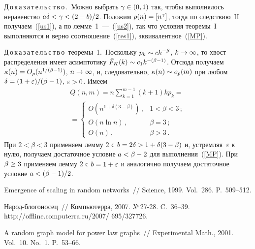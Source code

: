 \begin{multicols}{2}
    
    \medskip
    
    \noindent
    Д\,о\,к\,а\,з\,а\,т\,е\,л\,ь\,с\,т\,в\,о\,.\
    Можно выбрать $\gamma\hm\in (0,1)$
    так, чтобы выполнялось неравенство $a\delta\hm<\gamma\hm<(2-b)/2$.
    Положим $\rho(n)\hm=[n^\gamma]$, тогда
    по следствию~II получаем~(\ref{us1}), а по лемме~1~---~(\ref{us2}),
    так что условия теоремы~I выполняются и верно соотношение~(\ref{res1}), 
    эквивалентное~(\ref{MP}).

\smallskip

\noindent
Д\,о\,к\,а\,з\,а\,т\,е\,л\,ь\,с\,т\,в\,о\ теоремы~1.\
    Поскольку $p_k\hm\sim ck^{-\beta}$,
    $k\hm\to\infty$, то хвост распределения имеет
    асимптотику ${\bar F}_K(k)\hm\sim c_1k^{-(\beta-1)}$.
    Отсюда получаем
    $\kappa(n)\hm=O_p(n^{1/(\beta-1)})$, $n\hm\to\infty$,
    и, следовательно, $\kappa(n)\hm\sim o_p(m)$ при любом
    $\delta\hm=(1+\varepsilon)/(\beta-1)$, $\varepsilon\hm>0$. Имеем
    \begin{multline*}
    Q(n,m)=n\sum\limits_{k=1}^{m-1}(k+1)kp_k={}\\
    {}=
\begin{cases}
    O(n^{1+\delta(3-\beta)})\,,& 1<\beta<3\,;\\
    O(n\ln n)\,,& \beta=3\,;\\
    O(n)\,, & \beta>3\,.
    \end{cases}
    \end{multline*}
    При $2<\beta<3$ применяем лемму 2 с $b\hm=2\delta\hm>1\hm+\delta(3\hm-\beta)$ и,
    устремляя~$\varepsilon$ к нулю,
    получаем достаточное условие $a\hm<\beta\hm-2$ для выполнения~(\ref{MP}).
    При $\beta\hm\ge 3$ применяем лемму 2 с $b\hm=1\hm+\varepsilon$ и
    аналогично получаем достаточное условие $a\hm<(\beta-1)/2$.
    
    {\small\frenchspacing
{%
\begin{thebibliography}{9}


     Emergence of scaling in random networks~//
    Science, 1999. Vol.~286. P.~509--512.

     Народ-бло\-го\-но\-сец~// Компьютерра,
    2007. №\,27-28. C.~36--39. {\sf http://offline.computerra.ru/2007/ 695/327726}.

    \bibitem{Pow}
     A random graph model for power law
    graphs~// Experimental Math., 2001. Vol.~10. No.~1. P.~53--66.


\end{thebibliography}}}
\end{multicols}
